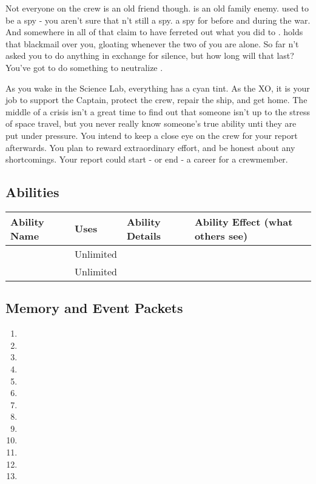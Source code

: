\documentclass[char]{TMFHope}
\begin{document}
Not everyone on the crew is an old friend though. \cDip{} is an old family enemy. \cDip{\They} used to be a spy - you aren't sure that \cDip{\they} \cDip{\are}n't still a spy. \cDip{\They} \cDip{\were} a spy for \pPlan{} before and during the war. And somewhere in all of that \cDip{\they} claim\cDip{\plural} to have ferreted out what you did to \cCap{}. \cDip{} holds that blackmail over you, gloating whenever the two of you are alone. So far \cDip{\they} \cDip{\have}n't asked you to do anything in exchange for \cDip{\their} silence, but how long will that last? You've got to do something to neutralize \cDip{\them}.

As you wake in the Science Lab, everything has a cyan tint.  As the XO, it is your job to support the Captain, protect the crew, repair the ship, and get home. The middle of a crisis isn't a great time to find out that someone isn't up to the stress of space travel, but you never really know someone's true ability unti they are put under pressure. You intend to keep a close eye on the crew for your report afterwards. You plan to reward extraordinary effort, and be honest about any shortcomings. Your report could start - or end - a career for a crewmember.

\subsection*{Abilities}
\begin{tabular}{|p{3cm}|p{1.5cm}|p{8cm}|p{3.5cm}|} 
 \hline
 \textbf{Ability Name} & \textbf{Uses} & \textbf{Ability Details} & \textbf{Ability Effect (what others see)} \\ 
\hline 
\aThreat{\MYname} & Unlimited & \aThreat{\MYtext} & \aThreat{\MYeffect} \\ 
\hline 
\aCalculate{\MYname} & Unlimited & \aCalculate{\MYtext} & \aCalculate{\MYeffect}\\ 
 \hline
\end{tabular}

\subsection*{Memory and Event Packets}
\begin{enumerate}
	\item \mPractice{\MYname}
	\item \mXAlpha{\MYname}
	\item \mThreatOne{\MYname}
	\item \mThreatTwo{\MYname}
	\item \mThreatThree{\MYname}
	\item \mThreatFour{\MYname}
	\item \mBroom{\MYname}
	\item \mLab{\MYname}
	\item \mPatient{\MYname}
	\item \mKitchen{\MYname}
	\item \mWeight{\MYname}
	\item \mTheater{\MYname}
	\item \mCrates{\MYname}
\end{enumerate}
\end{document}
